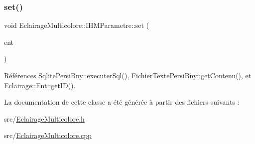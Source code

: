 \subsubsection{\texorpdfstring{set()}{set()}}
{\footnotesize\ttfamily void Eclairage\+Multicolore\+::\+I\+H\+M\+Parametre\+::set (\begin{DoxyParamCaption}\item[{\hyperlink{classEclairageMulticolore_1_1Ent}{Eclairage\+Multicolore\+::\+Ent} \&}]{ent }\end{DoxyParamCaption})}



Références Sqlite\+Persi\+Bny\+::executer\+Sql(), Fichier\+Texte\+Persi\+Bny\+::get\+Contenu(), et Eclairage\+::\+Ent\+::get\+I\+D().



La documentation de cette classe a été générée à partir des fichiers suivants \+:\begin{DoxyCompactItemize}
\item 
src/\hyperlink{EclairageMulticolore_8h}{Eclairage\+Multicolore.\+h}\item 
src/\hyperlink{EclairageMulticolore_8cpp}{Eclairage\+Multicolore.\+cpp}\end{DoxyCompactItemize}
